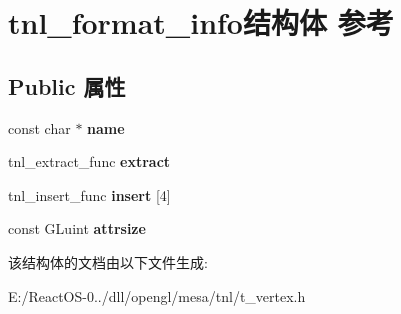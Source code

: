 \hypertarget{structtnl__format__info}{}\section{tnl\+\_\+format\+\_\+info结构体 参考}
\label{structtnl__format__info}
\subsection*{Public 属性}
\begin{DoxyCompactItemize}
\item 
\mbox{\label{structtnl__format__info_a7d68aec3cdfd146e697fd4b2ec731c1d}} 
const char $\ast$ {\bfseries name}
\item 
\mbox{\label{structtnl__format__info_a4bbc69e07cb52a3e8e3238dd1f514afc}} 
tnl\+\_\+extract\+\_\+func {\bfseries extract}
\item 
\mbox{\label{structtnl__format__info_a33ea278537dbc5bf1f471b9c27179392}} 
tnl\+\_\+insert\+\_\+func {\bfseries insert} \mbox{[}4\mbox{]}
\item 
\mbox{\label{structtnl__format__info_a503d61b21e2c4c0e06fc34aaebcb374d}} 
const G\+Luint {\bfseries attrsize}
\end{DoxyCompactItemize}


该结构体的文档由以下文件生成\+:\begin{DoxyCompactItemize}
\item 
E\+:/\+React\+O\+S-\/0../dll/opengl/mesa/tnl/t\+\_\+vertex.\+h\end{DoxyCompactItemize}
